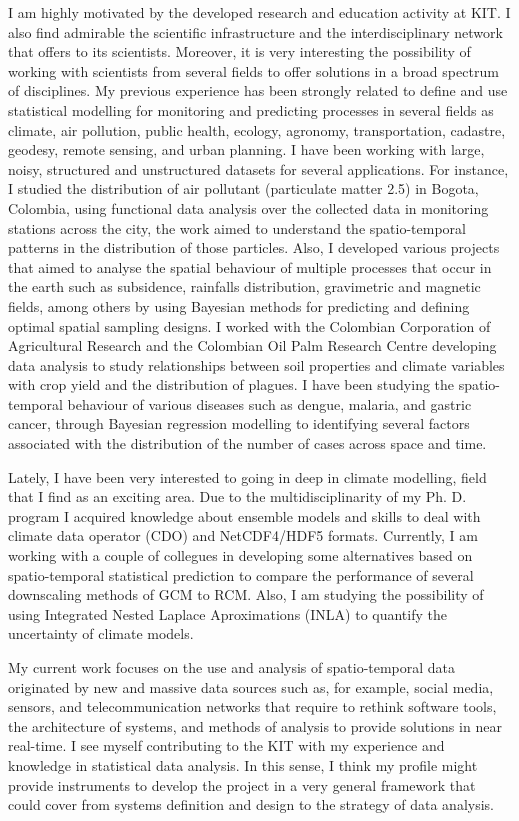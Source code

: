 \documentclass[11pt, a4paper]{awesome-cv}
\begin{document}
\begin{cvletter}
I am highly motivated by the developed research and education activity at KIT. I also find admirable the scientific infrastructure and the interdisciplinary network that offers to its scientists. Moreover, it is very interesting the possibility of working with scientists from several fields to offer solutions in a broad spectrum of disciplines. My previous experience has been strongly related to define and use statistical modelling for monitoring and predicting processes in several fields as climate, air pollution, public health, ecology, agronomy, transportation, cadastre, geodesy, remote sensing, and urban planning. I have been working with large, noisy, structured and unstructured datasets for several applications. For instance, I studied the distribution of air pollutant (particulate matter 2.5) in Bogota, Colombia, using functional data analysis over the collected data in monitoring stations across the city, the work aimed to understand the spatio-temporal patterns in the distribution of those particles. Also, I developed various projects that aimed to analyse the spatial behaviour of multiple processes that occur in the earth such as subsidence, rainfalls distribution, gravimetric and magnetic fields, among others by using Bayesian methods for predicting and defining optimal spatial sampling designs. I worked with the Colombian Corporation of Agricultural Research and the Colombian Oil Palm Research Centre developing data analysis to study relationships between soil properties and climate variables with crop yield and the distribution of plagues. I have been studying the spatio-temporal behaviour of various diseases such as dengue, malaria, and gastric cancer, through Bayesian regression modelling to identifying several factors associated with the distribution of the number of cases across space and time.\par
Lately, I have been very interested to going in deep in climate modelling, field that I find as an exciting area. Due to the multidisciplinarity of my Ph. D. program I acquired knowledge about ensemble models and skills to deal with climate data operator (CDO) and NetCDF4/HDF5 formats. Currently, I am working with a couple of collegues in developing some alternatives based on spatio-temporal statistical prediction to compare the performance of several downscaling methods of GCM to RCM. Also, I am studying the possibility of using Integrated Nested Laplace Aproximations (INLA) to quantify the uncertainty of climate models.\par
My current work focuses on the use and analysis of spatio-temporal data originated by new and massive data sources such as, for example, social media, sensors, and telecommunication networks that require to rethink software tools, the architecture of systems, and methods of analysis to provide solutions in near real-time. I see myself contributing to the KIT with my experience and knowledge in statistical data analysis. In this sense, I think my profile might provide instruments to develop the project in a very general framework that could cover from systems definition and design to the strategy of data analysis.\par

\end{cvletter}
\end{document}
